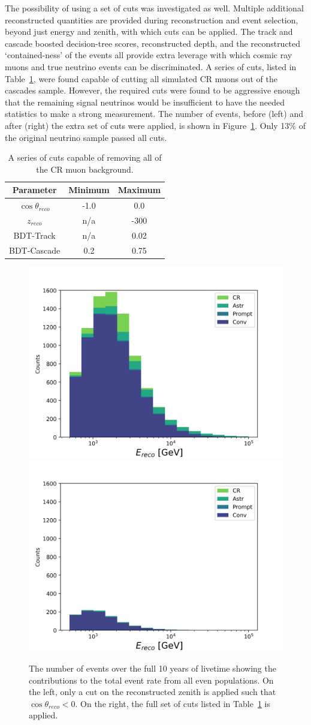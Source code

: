 \documentclass[main.tex]{subfiles}
\begin{document}
The possibility of using a set of cuts was investigated as well. 
Multiple additional reconstructed quantities are provided during reconstruction and event selection, beyond just energy and zenith, with which cuts can be applied. 
The track and cascade boosted decision-tree scores, reconstructed depth, and the reconstructed `contained-ness' of the events all provide extra leverage with which cosmic ray muons and true neutrino events can be discriminated.
A series of cuts, listed in Table~\ref{tab:cut_table}, were found capable of cutting all simulated CR muons out of the cascades sample.
However, the required cuts were found to be aggressive enough that the remaining signal neutrinos would be insufficient to have the needed statistics to make a strong measurement.
The number of events, before (left) and after (right) the extra set of cuts were applied, is shown in Figure~\ref{fig:cut_figure}.
Only 13\% of the original neutrino sample passed all cuts. 

\begin{table}
    \centering
    \begin{tabular}{c|cc}\rowcolor{blue!25}
        Parameter & Minimum & Maximum \\\hline
        $\cos\theta_{reco}$ & -1.0 & 0.0 \\
        $z_{reco}$ & n/a & -300 \\
        BDT-Track & n/a & 0.02 \\
        BDT-Cascade & 0.2 & 0.75
    \end{tabular}
    \caption{A series of cuts capable of removing all of the CR muon background.}\label{tab:cut_table}
\end{table}


\begin{figure}
    \centering
    \includegraphics[width=0.45\linewidth]{figures/zenith_only_cut.png}%
    \includegraphics[width=0.45\linewidth]{figures/all_cuts.png}
    \caption{The number of events over the full 10 years of livetime showing the contributions to the total event rate from all even populations. On the left, only a cut on the reconstructed zenith is applied such that $\cos\theta_{reco}<0$. On the right, the full set of cuts listed in Table~\ref{tab:cut_table} is applied. }\label{fig:cut_figure}
\end{figure}
\end{document}
